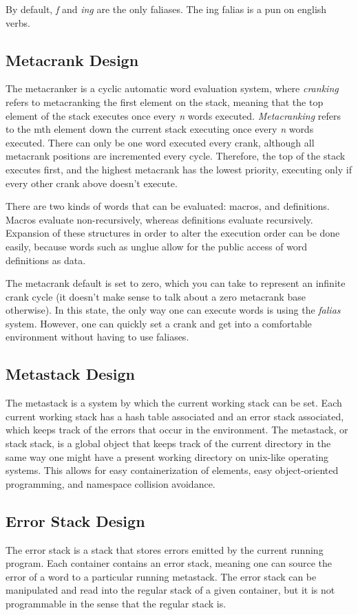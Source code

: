 \documentclass[
	letterpaper,
	10pt,
	twoside,
]{LTJournalArticle}
\begin{document}
By default, \emph{f} and \emph{ing} are the only faliases. The ing falias is a pun on english verbs.
\subsection{Metacrank Design}
The metacranker is a cyclic automatic word evaluation system, where \emph{cranking} refers to metacranking the first
element on the stack, meaning that the top element of the stack executes once every \emph{n} words executed. \emph{Metacranking}
refers to the mth element down the current stack executing once every \emph{n} words executed. There can only be one word
executed every crank, although all metacrank positions are incremented every cycle. Therefore, the top of the stack executes
first, and the highest metacrank has the lowest priority, executing only if every other crank above doesn't execute.

There are two kinds of words that can be evaluated: macros, and definitions. Macros evaluate non-recursively, whereas definitions
evaluate recursively. Expansion of these structures in order to alter the execution order can be done easily, because words
such as unglue allow for the public access of word definitions as data.

The metacrank default is set to zero, which you can take to represent an infinite crank cycle (it doesn't make sense to talk
about a zero metacrank base otherwise). In this state, the only way one can execute words is using the \emph{falias} system.
However, one can quickly set a crank and get into a comfortable environment without having to use faliases.
\subsection{Metastack Design}
The metastack is a system by which the current working stack can be set. Each current working stack has a hash table associated
and an error stack associated, which keeps track of the errors that occur in the environment. The metastack, or stack stack,
is a global object that keeps track of the current directory in the same way one might have a present working directory on
unix-like operating systems. This allows for easy containerization of elements, easy object-oriented programming, and
namespace collision avoidance.
\subsection{Error Stack Design}
The error stack is a stack that stores errors emitted by the current running program. Each container contains an error stack,
meaning one can source the error of a word to a particular running metastack. The error stack can be manipulated and read
into the regular stack of a given container, but it is not programmable in the sense that the regular stack is.
\end{document}

